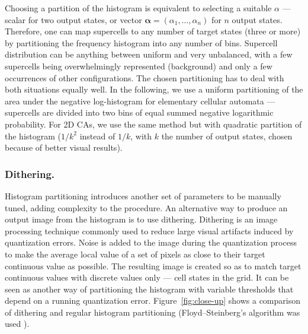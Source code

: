 Choosing a partition of the histogram is equivalent to selecting a suitable
$\alpha$ --- scalar for two output states, or vector $\mathbf{\alpha} =
(\alpha_1, \ldots, \alpha_n)$ for $n$ output states. Therefore, one can map
supercells to any number of target states (three or more) by partitioning the
frequency histogram into any number of bins. Supercell distribution can be
anything between uniform and very unbalanced, with a few supercells being
overwhelmingly represented (background) and only a few occurrences of other
configurations. The chosen partitioning has to deal with both situations equally
well. In the following, we use a uniform partitioning of the area under the
negative log-histogram for elementary cellular automata --- supercells are
divided into two bins of equal summed negative logarithmic probability. For 2D
CAs, we use the same method but with quadratic partition of the histogram
($1/k^2$ instead of $1/k$, with $k$ the number of output states, chosen because
of better visual results).

\subsubsection{Dithering.}\label{sec:dithering}
Histogram partitioning introduces another set of parameters to be manually
tuned, adding complexity to the procedure. An alternative way to produce an
output image from the histogram is to use dithering. Dithering is an image
processing technique commonly used to reduce large visual artifacts induced by
quantization errors. Noise is added to the image during the quantization process
to make the average local value of a set of pixels as close to their target
continuous value as possible. The resulting image is created so as to match
target continuous values with discrete values only --- cell states in the grid.
It can be seen as another way of partitioning the histogram with variable
thresholds that depend on a running quantization error.
Figure~\ref{fig:close-up} shows a comparison of dithering and regular histogram
partitioning (Floyd–Steinberg's algorithm was used
\parencite{floydAdaptiveAlgorithmSpatial1976}).

